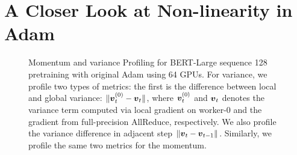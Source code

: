 \section{A Closer Look at Non-linearity in Adam}
\label{sec:motivation}
\begin{figure}[t!]
  \centering
  \caption{Momentum and variance Profiling for BERT-Large sequence 128 pretraining with original Adam using 64 GPUs. For variance, we profile two types of metrics: the first is the difference between local and global variance: $\|\boldsymbol{v}_t^{(0)}-\boldsymbol{v}_t\|$, where $\boldsymbol{v}_t^{(0)}$ and $\boldsymbol{v}_t$ denotes the variance term computed via local gradient on worker-0 and the gradient from full-precision AllReduce, respectively. We also profile the variance difference in adjacent step $\|\boldsymbol{v}_t-\boldsymbol{v}_{t-1}\|$. Similarly, we profile the same two metrics for the momentum.}
  \label{fig:profile_bert_large}
\end{figure}

